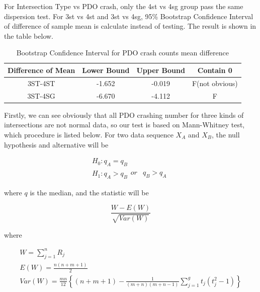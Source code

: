 \documentclass[11pt]{scrartcl} %
\begin{document}
For Intersection Type vs PDO crash, only the 4st vs 4sg group pass the same dispersion test. For 3st vs 4st and 3st vs 4sg, 95\% Bootstrap Confidence Interval of difference of sample mean is calculate instead of testing. The result is shown in the table below.

\begin{table}[H]
\caption{Bootstrap Confidence Interval for PDO crash counts mean difference}
\centering
\begin{tabular}{|c|c|c|c|}
\hline
Difference of Mean  & Lower Bound & Upper Bound & Contain 0 \\
\hline
3ST-4ST & -1.652 & -0.019 & F(not obvious) \\
\hline
3ST-4SG   & -6.670  & -4.112  & F \\
\hline
\end{tabular}
\end{table}

Firstly, we can see obviously that all PDO crashing number for three kinds of intersections are not normal data, so our test is based on Mann-Whitney test, which procedure is listed below. For two data sequence ${X_A}$ and ${X_B}$, the null hypothesis and alternative will be

\begin{equation*}
\begin{array}{l}
{H_0}:{q_A} = {q_B}\\
{H_1}:{q_A} > {q_B}\begin{array}{*{20}{c}}
{or}&{{q_B} > {q_A}}
\end{array}
\end{array}
\end{equation*}


where $q$ is the median, and the statistic will be

\begin{equation}
\frac{{W - E\left( W \right)}}{{\sqrt {Var\left( W \right)} }}
\end{equation}

where

\begin{equation}
\label{mw-stat}
\begin{array}{l}
W = \sum\limits_{j = 1}^n {{R_j}} \\
E\left( W \right) = \frac{{n\left( {n + m + 1} \right)}}{2}\\
Var\left( W \right) = \frac{{mn}}{{12}}\left\{ {\left( {n + m + 1} \right) - \frac{1}{{\left( {m + n} \right)\left( {m + n - 1} \right)}}\sum\limits_{j = 1}^g {{t_j}\left( {t_j^2 - 1} \right)} } \right\}
\end{array}
\end{equation}
\end{document}
